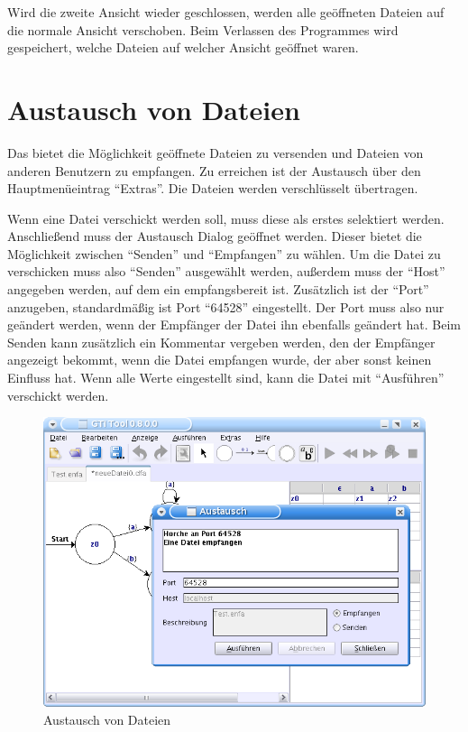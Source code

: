 Wird die zweite Ansicht wieder geschlossen, werden alle
geöffneten Dateien auf die normale Ansicht verschoben. Beim Verlassen des
Programmes wird gespeichert, welche Dateien auf welcher Ansicht geöffnet waren.


\section{Austausch von Dateien}

Das \gtitool bietet die Möglichkeit geöffnete Dateien zu versenden und Dateien
von anderen \gtitool Benutzern zu empfangen. Zu erreichen ist der Austausch über
den Hauptmenüeintrag "`Extras"'. Die Dateien werden verschlüsselt
übertragen.\vspace{10pt}

Wenn eine Datei verschickt werden soll, muss diese als erstes selektiert werden.
Anschließend muss der Austausch Dialog geöffnet werden. Dieser bietet die
Möglichkeit zwischen "`Senden"' und "`Empfangen"' zu wählen. Um die Datei zu
verschicken muss also "`Senden"' ausgewählt werden, außerdem muss der "`Host"'
angegeben werden, auf dem ein \gtitool empfangsbereit ist. Zusätzlich ist der
"`Port"' anzugeben, standardmäßig ist Port "`64528"' eingestellt. Der Port muss
also nur geändert werden, wenn der Empfänger der Datei ihn ebenfalls geändert
hat. Beim Senden kann zusätzlich ein Kommentar vergeben werden, den der Empfänger
angezeigt bekommt, wenn die Datei empfangen wurde, der aber sonst keinen
Einfluss hat. Wenn alle Werte eingestellt sind, kann die Datei mit
"`Ausführen"' verschickt werden.\vspace{10pt}

\begin{figure}[h]
\begin{center}
\includegraphics[width=12cm]{../images/exchange.png}
\caption{Austausch von Dateien}
\end{center}
\end{figure}

